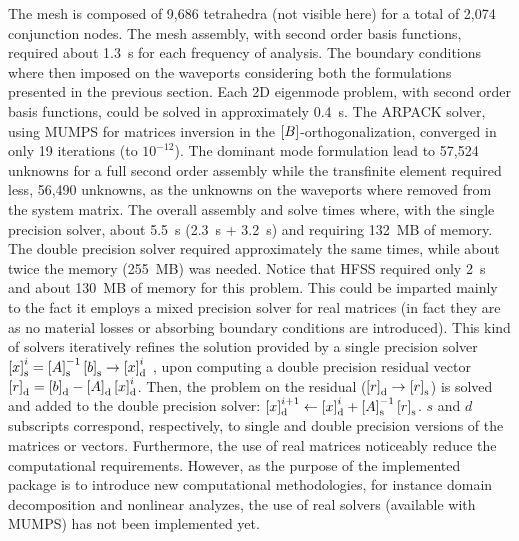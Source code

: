 The mesh is composed of 9,686 tetrahedra (not visible here) for a total of 2,074 conjunction nodes. The mesh assembly, with second order basis functions, required about 1.3~s for each frequency of analysis. The boundary conditions where then imposed on the waveports considering both the formulations presented in the previous section. Each 2D eigenmode problem, with second order basis functions, could be solved in approximately 0.4~s. The ARPACK solver, using MUMPS for matrices inversion in the $\left[B\right]$-orthogonalization, converged in only 19 iterations (to $10^{-12}$). The dominant mode formulation lead to 57,524 unknowns for a full second order assembly while the transfinite element required less, 56,490 unknowns, as the unknowns on the waveports where removed from the system matrix. 
The overall assembly and solve times where, with the single precision solver, about 5.5~s (2.3~s + 3.2~s) and requiring 132~MB of memory. The double precision solver required approximately the same times, while about twice the memory (255~MB) was needed. Notice that HFSS required only 2~s and about 130~MB of memory for this problem. This could be imparted mainly to the fact it employs a mixed precision solver \cite{sun2008high} for real matrices (in fact they are as no material losses or absorbing boundary conditions are introduced). This kind of solvers iteratively refines the solution provided by a single precision solver $\left[{{x}}\right]_\mathrm{s}^i =\left[A\right]_\mathrm{s}^{-1}\left[{{b}}\right]_\mathrm{s} \rightarrow \left[{{x}}\right]_\mathrm{d}^i$ , upon computing a double precision residual vector $\left[{{r}}\right]_\mathrm{d} = \left[{{b}}\right]_\mathrm{d} - \left[A\right]_\mathrm{d}\left[{{x}}\right]_\mathrm{d}^i$. Then, the problem on the residual ($\left[{{r}}\right]_\mathrm{d} \rightarrow \left[{{r}}\right]_\mathrm{s}$) is solved and added to the double precision solver: $\left[{{x}}\right]_\mathrm{d}^{i+1} \leftarrow \left[{{x}}\right]_\mathrm{d}^i + \left[A\right]_\mathrm{s}^{-1}\left[{{r}}\right]_\mathrm{s}$. $s$ and $d$ subscripts correspond, respectively, to single and double precision versions of the matrices or vectors. Furthermore, the use of real matrices noticeably reduce the computational requirements. However, as the purpose of the implemented package is to introduce new computational methodologies, for instance domain decomposition and nonlinear analyzes, the use of real solvers (available with MUMPS) has not been implemented yet.

